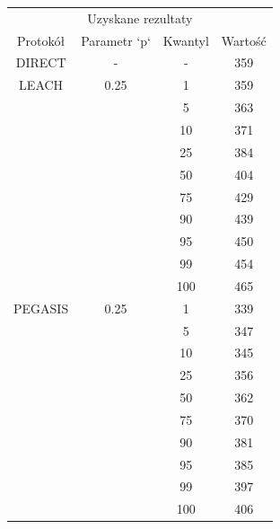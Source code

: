 \documentclass[a4paper,12pt,twoside,openany]{report}
\begin{document}
\begin{longtable}{*{4}{c}}
\toprule
\multicolumn{4}{c}{Uzyskane rezultaty} \\
Protokół	& Parametr `p`	& Kwantyl	& Wartość \\
\midrule
\endhead
DIRECT	& - 	& -	& 359 \\*
\midrule
LEACH	& 0.25	& 1	& 359 \\*
	&	& 5	& 363 \\*
	&	& 10	& 371 \\*
	&	& 25	& 384 \\*
	&	& 50	& 404 \\*
	&	& 75	& 429 \\*
	&	& 90	& 439 \\*
	&	& 95	& 450 \\*
	&	& 99	& 454 \\*
	&	& 100	& 465 \\*
\midrule
PEGASIS	& 0.25	& 1	& 339 \\*
	&	& 5	& 347 \\*
	&	& 10	& 345 \\*
	&	& 25	& 356 \\*
	&	& 50	& 362 \\*
	&	& 75	& 370 \\*
	&	& 90	& 381 \\*
	&	& 95	& 385 \\*
	&	& 99	& 397 \\*
	&	& 100	& 406 \\*
\bottomrule
\end{longtable}
\end{document}
